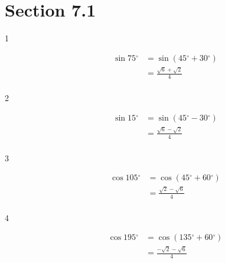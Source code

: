 \documentclass{exam}
\newcommand{\dg}{\ensuremath{^\circ}}
\begin{document}
    \section{Section 7.1}
    \begin{description}

      \item[1] 
        \begin{align*}
          \sin 75 \dg & = \sin (45 \dg + 30 \dg) \\
                      & = \boxed{ \frac{\sqrt{6} + \sqrt{2}}{4} } \\
        \end{align*}

      \item[2] 
        \begin{align*}
          \sin 15 \dg & = \sin (45 \dg - 30 \dg) \\
                      & = \boxed{ \frac{\sqrt{6} - \sqrt{2}}{4} } \\
        \end{align*}

      \item[3] 
        \begin{align*}
          \cos 105 \dg & = \cos (45 \dg + 60 \dg) \\
                      & = \boxed{ \frac{\sqrt{2} - \sqrt{6}}{4} } \\
        \end{align*}

      \item[4] 
        \begin{align*}
          \cos 195 \dg & = \cos (135 \dg + 60 \dg) \\
                      & = \boxed{ \frac{- \sqrt{2} - \sqrt{6}}{4} } \\
        \end{align*}


\end{description}
\end{document}
